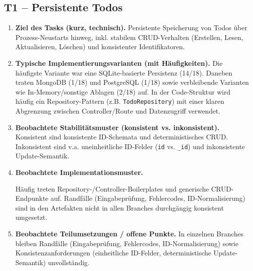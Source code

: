 \subsection*{T1 -- Persistente Todos}
\begin{enumerate}
  \item  \textbf{Ziel des Tasks (kurz, technisch).} Persistente Speicherung von Todos über Prozess-Neustarts hinweg, inkl. stabilem CRUD-Verhalten (Erstellen, Lesen, Aktualisieren, Löschen) und konsistenter Identifikatoren.

  \item  \textbf{Typische Implementierungsvarianten (mit Häufigkeiten).} Die häufigste Variante war eine SQLite-basierte Persistenz (14/18). Daneben traten MongoDB (1/18) und PostgreSQL (1/18) sowie verbleibende Varianten wie In-Memory/sonstige Ablagen (2/18) auf. In der Code-Struktur wird häufig ein Repository-Pattern (z.B. \texttt{TodoRepository}) mit einer klaren Abgrenzung zwischen Controller/Route und Datenzugriff verwendet.

  \item  \textbf{Beobachtete Stabilitätsmuster (konsistent vs. inkonsistent).} Konsistent sind konsistente ID-Schemata und deterministisches CRUD. Inkonsistent sind v.a. uneinheitliche ID-Felder (\texttt{id} vs. \texttt{\_id}) und inkonsistente Update-Semantik.

  \item  \textbf{Beobachtete Implementationsmuster.} 
  \begin{sloppypar}Häufig treten Repository-/Controller-Boilerplates und generische CRUD-Endpunkte auf. Randfälle (Eingabeprüfung, Fehlercodes, ID-Normalisierung) sind in den Artefakten nicht in allen Branches durchgängig konsistent umgesetzt.\end{sloppypar}

  \item  \textbf{Beobachtete Teilumsetzungen / offene Punkte.} In einzelnen Branches bleiben Randfälle (Eingabeprüfung, Fehlercodes, ID-Normalisierung) sowie Konsistenzanforderungen (einheitliche ID-Felder, deterministische Update-Semantik) unvollständig.
\end{enumerate}

